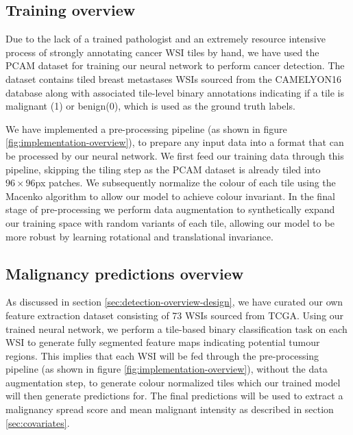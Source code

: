 \documentclass{l4proj}
\begin{document}
\subsection{Training overview}
Due to the lack of a trained pathologist and an extremely resource intensive process of strongly annotating cancer WSI tiles by hand, we have used the PCAM dataset for training our neural network to perform cancer detection. The dataset contains tiled breast metastases WSIs sourced from the CAMELYON16 database along with associated tile-level binary annotations indicating if a tile is malignant (1) or benign(0), which is used as the ground truth labels.

We have implemented a pre-processing pipeline (as shown in figure \ref{fig:implementation-overview}),  to prepare any input data into a format that can be processed by our neural network. We first feed our training data through this pipeline, skipping the tiling step as the PCAM dataset is already tiled into \(96 \times 96\)px patches. We subsequently normalize the colour of each tile using the Macenko algorithm to allow our model to achieve colour invariant. In the final stage of pre-processing we perform data augmentation to synthetically expand our training space with random variants of each tile, allowing our model to be more robust by learning rotational and translational invariance.

\subsection{Malignancy predictions overview}
As discussed in section \ref{sec:detection-overview-design}, we have curated our own feature extraction dataset consisting of 73 WSIs sourced from TCGA. Using our trained neural network, we perform a tile-based binary classification task on each WSI to generate fully segmented feature maps indicating potential tumour regions. This implies that each WSI will be fed through the pre-processing pipeline (as shown in figure \ref{fig:implementation-overview}), without the data augmentation step, to generate colour normalized tiles which our trained model will then generate predictions for. The final predictions will be used to extract a malignancy spread score and mean malignant intensity as described in section \ref{sec:covariates}.
\end{document}
